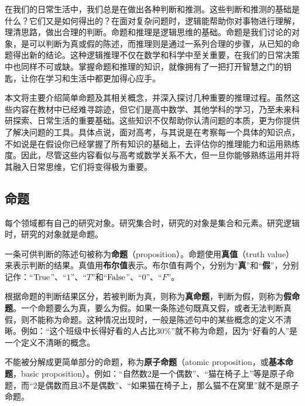 

\begin{issues}
\issueDraft
\end{issues}


在我们的日常生活中，我们总是在做出各种判断和推测。这些判断和推测的基础是什么？它们又是如何得出的？在面对复杂问题时，逻辑能帮助你对事物进行理解，理清思路，做出合理的判断。命题和推理是逻辑思维的基础。命题是我们讨论的对象，是可以判断为真或假的陈述，而推理则是通过一系列合理的步骤，从已知的命题得出新的结论。这种逻辑推理不仅在数学和科学中至关重要，在我们的日常决策中也同样不可或缺。掌握命题和推理的知识，就像拥有了一把打开智慧之门的钥匙，让你在学习和生活中都更加得心应手。

本文将主要介绍简单命题及其相关概念，并深入探讨几种重要的推理过程。虽然这些内容在教材中已经难寻踪迹，但它们是高中数学、其他学科的学习，乃至未来科研探索、日常生活的重要基础。这些知识不仅帮助你认清问题的本质，更为你提供了解决问题的工具。具体点说，面对高考，与其说是在考察每一个具体的知识点，不如说是在假设你已经掌握了所有知识的基础上，去评估你的推理能力和运用熟练度。因此，尽管这些内容看似与高考或数学关系不大，但一旦你能够熟练运用并将其融入日常思维，它们将变得极为重要。

\subsection{命题}

每个领域都有自己的研究对象。研究集合时，研究的对象是集合和元素。研究逻辑时，研究的对象就是命题。

一条可供判断的陈述句被称为\textbf{命题}（proposition）。命题使用\textbf{真值}（truth value）来表示判断的结果。真值用\textbf{布尔值}表示。布尔值有两个，分别为“\textbf{真}”和“\textbf{假}”，分别记作：“${\rm True}$”、“$1$”、“$T$”和“${\rm False}$”、“$0$”、“$F$”。

根据命题的判断结果区分，若被判断为真，则称为\textbf{真命题}，判断为假，则称为\textbf{假命题}。一个命题要么为真，要么为假。如果一条陈述句既真又假，或者无法判断真假，则不能称为命题。这种情况出现时，一般是陈述句中的某些概念的定义不清晰。例如：“这个班级中长得好看的人占比$30\%$”就不称为命题，因为“好看的人”是一个定义不清晰的概念。

不能被分解成更简单部分的命题，称为\textbf{原子命题}（atomic proposition，或\textbf{基本命题}，basic proposition）。例如：“自然数2是一个偶数”、“猫在椅子上”等是原子命题，而“2是偶数而且3不是偶数”、“如果猫在椅子上，那么猫不在窝里”就不是原子命题。

